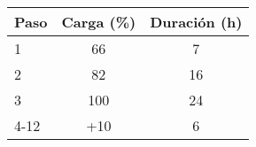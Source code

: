 \documentclass[varwidth=\maxdimen]{standalone}
\begin{document}
\begin{tabular}{ l c c }
	\toprule
	Paso	& Carga (\%)	& Duración (h) \\
	\midrule
	1		& 66	& 7 \\
	2		& 82	& 16 \\
	3		& 100	& 24\\
	4-12	& +10	& 6 \\
	\bottomrule
\end{tabular}
\end{document}
